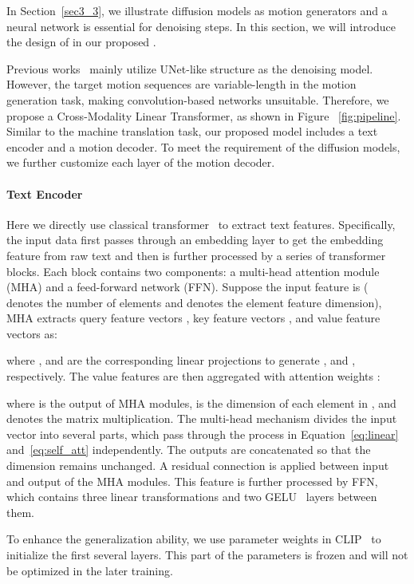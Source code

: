 In Section~\ref{sec3_3}, we illustrate diffusion models as motion generators and a neural network  is essential for denoising steps. In this section, we will introduce the design of  in our proposed \name.

Previous works~\citep{ho2020denoising,dhariwal2021diffusion,nichol2021improved,nichol2021glide} mainly utilize UNet-like structure as the denoising model. However, the target motion sequences are variable-length in the motion generation task, making convolution-based networks unsuitable. Therefore, we propose a Cross-Modality Linear Transformer, as shown in Figure ~\ref{fig:pipeline}. Similar to the machine translation task, our proposed model includes a text encoder and a motion decoder. To meet the requirement of the diffusion models, we further customize each layer of the motion decoder.

\paragraph{Text Encoder} Here we directly use classical transformer~\cite{vaswani2017attention} to extract text features. Specifically, the input data first passes through an embedding layer to get the embedding feature from raw text and then is further processed by a series of transformer blocks. Each block contains two components: a multi-head attention module (MHA) and a feed-forward network (FFN). Suppose the input feature is  ( denotes the number of elements and  denotes the element feature dimension), MHA extracts query feature vectors , key feature vectors , and value feature vectors  as:



where ,  and  are the corresponding linear projections to generate ,  and , respectively. 
The value features are then aggregated with attention weights :

where  is the output of MHA modules,  is the dimension of each element in , and  denotes the matrix multiplication. The multi-head mechanism divides the input vector into several parts, which pass through the process in Equation~\ref{eq:linear} and~\ref{eq:self_att} independently. The outputs are concatenated so that the dimension remains unchanged. A residual connection is applied between input and output of the MHA modules. This feature is further processed by FFN, which contains three linear transformations and two GELU~\citep{hendrycks2016gaussian} layers between them.

To enhance the generalization ability, we use parameter weights in  CLIP~\citep{radford2021learning} to initialize the first several layers. This part of the parameters is frozen and will not be optimized in the later training.

